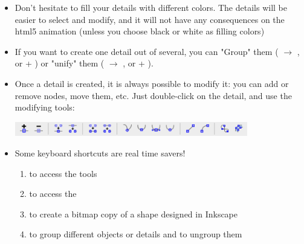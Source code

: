 \begin{itemize}
 \item Don't hesitate to fill your details with different colors. 
The details will be easier to select and modify, and it will not 
have any consequences on the html5 animation (unless you choose black or white as filling colors)
 \item If you want to create one detail out of several, you can "Group" them 
 ( $\rightarrow$ , or \Ctrl + ) or "unify" them 
 ( $\rightarrow$ , or \Ctrl + \keystroke{+}).
 \item Once a detail is created, it is always possible to modify it: you can add or remove
 nodes, move them, etc. Just double-click on the detail, and use the modifying tools:\\
 \begin{center}
 \includegraphics[width=0.8\textwidth]{./images/modifynodes}\\  
 \end{center}
 \item Some keyboard shortcuts are real time savers!
 \begin{enumerate}
  \item {} to access the  tools
  \item {} to access the 
  \item {} to create a bitmap copy of a shape designed in Inkscape
  \item {} to group different objects or details 
  and  to ungroup them
 \end{enumerate} 
\end{itemize}

\listoffigures
\listoftables


